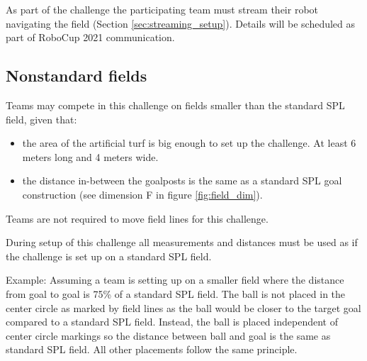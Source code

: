 As part of the challenge the participating team must stream their robot navigating the field (\cf Section \ref{sec:streaming_setup}). Details will be scheduled as part of RoboCup 2021 communication.

\subsection{Nonstandard fields}

Teams may compete in this challenge on fields smaller than the standard SPL field, given that:

\begin{itemize}
	\item the area of the artificial turf is big enough to set up the challenge. At least 6 meters long and 4 meters wide.
	\item the distance in-between the goalposts is the same as a standard SPL goal construction (see dimension F in figure \ref{fig:field_dim}).
\end{itemize}

Teams are not required to move field lines for this challenge.

During setup of this challenge all measurements and distances must be used as if the challenge is set up on a standard SPL field.

Example: Assuming a team is setting up on a smaller field where the distance from goal to goal is 75\% of a standard SPL field. The ball is not placed in the center circle as marked by field lines as the ball would be closer to the target goal compared to a standard SPL field. Instead, the ball is placed independent of center circle markings so the distance between ball and goal is the same as standard SPL field. All other placements follow the same principle.
